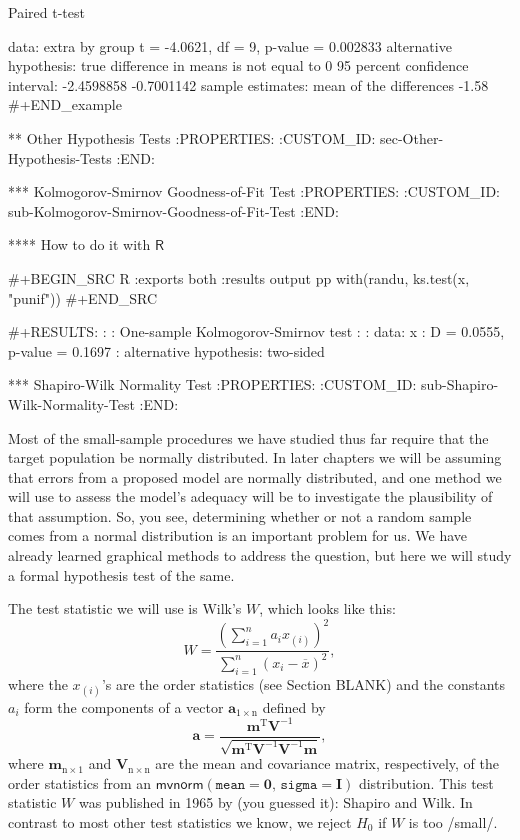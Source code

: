 	Paired t-test

data:  extra by group
t = -4.0621, df = 9, p-value = 0.002833
alternative hypothesis: true difference in means is not equal to 0
95 percent confidence interval:
 -2.4598858 -0.7001142
sample estimates:
mean of the differences 
                  -1.58
#+END_example

** Other Hypothesis Tests
:PROPERTIES:
:CUSTOM_ID: sec-Other-Hypothesis-Tests
:END:

*** Kolmogorov-Smirnov Goodness-of-Fit Test
:PROPERTIES:
:CUSTOM_ID: sub-Kolmogorov-Smirnov-Goodness-of-Fit-Test
:END:

**** How to do it with \(\mathsf{R}\)

#+BEGIN_SRC R :exports both :results output pp 
with(randu, ks.test(x, "punif"))
#+END_SRC

#+RESULTS:
: 
: 	One-sample Kolmogorov-Smirnov test
: 
: data:  x
: D = 0.0555, p-value = 0.1697
: alternative hypothesis: two-sided

*** Shapiro-Wilk Normality Test
:PROPERTIES:
:CUSTOM_ID: sub-Shapiro-Wilk-Normality-Test
:END:

Most of the small-sample procedures we have studied thus far require
that the target population be normally distributed.  In later chapters
we will be assuming that errors from a proposed model are normally
distributed, and one method we will use to assess the model's adequacy
will be to investigate the plausibility of that assumption. So, you
see, determining whether or not a random sample comes from a normal
distribution is an important problem for us.  We have already learned
graphical methods to address the question, but here we will study a
formal hypothesis test of the same.

The test statistic we will use is Wilk's \(W\), which looks like this:
\begin{equation}
W = \frac{\left(\sum_{i = 1}^{n} a_{i}x_{(i)} \right)^{2}}{\sum_{i = 1}^{n}(x_{i} - \overline{x})^{2}},
\end{equation}
where the \(x_{(i)}\)'s are the order statistics (see Section BLANK)
and the constants \(a_{i}\) form the components of a vector
\(\mathbf{a}_{1\times\mathrm{n}}\) defined by
\begin{equation}
\mathbf{a}=\frac{\mathbf{m}^{\mathrm{T}}\mathbf{V}^{-1}}{\sqrt{\mathbf{m}^{\mathrm{T}}\mathbf{V}^{-1}\mathbf{V}^{-1}\mathbf{m}}},
\end{equation}
where \(\mathbf{m}_{\mathrm{n}\times1}\) and \(\mathbf{V}_{\mathrm{n}
\times \mathrm{n}} \) are the mean and covariance matrix,
respectively, of the order statistics from an \(\mathsf{mvnorm}
\left(\mathtt{mean} = \mathbf{0},\,\mathtt{sigma} =
\mathbf{I}\right)\) distribution.  This test statistic \(W\) was
published in 1965 by (you guessed it): Shapiro and
Wilk\cite{Wilk1965}.  In contrast to most other test statistics we
know, we reject \(H_{0}\) if \(W\) is too /small/.


